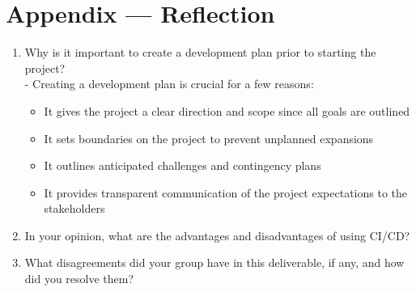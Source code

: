 \documentclass{article}
\begin{document}
\section*{Appendix --- Reflection}




\begin{enumerate}
    \item Why is it important to create a development plan prior to starting the
    project?\\
    - Creating a development plan is crucial for a few reasons:
    \begin{itemize}
      \item It gives the project a clear direction and scope since all goals are outlined
      \item It sets boundaries on the project to prevent unplanned expansions
      \item It outlines anticipated challenges and contingency plans
      \item It provides transparent communication of the project expectations to the stakeholders
    \end{itemize}
    \item In your opinion, what are the advantages and disadvantages of using
    CI/CD?
    \item What disagreements did your group have in this deliverable, if any,
    and how did you resolve them?
\end{enumerate}
\end{document}
